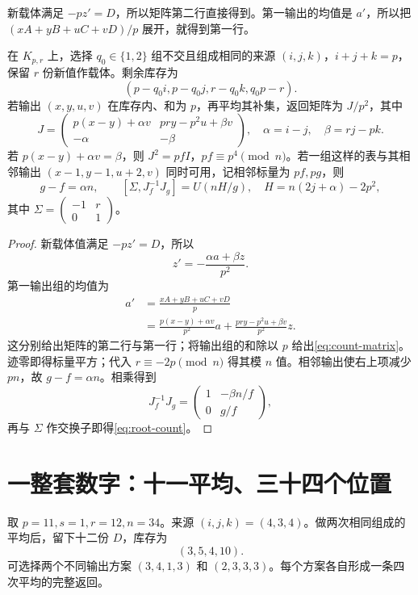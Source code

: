新载体满足 $-pz'=D$，所以矩阵第二行直接得到。第一输出的均值是 $a'$，所以把 $(xA+yB+uC+vD)/p$ 展开，就得到第一行。
\begin{lemma}[由库存表计算返回矩阵]\label{lem:count-interface}
在 $K_{p,r}$ 上，选择 $q_0\in\{1,2\}$ 组不交且组成相同的来源 $(i,j,k)$，$i+j+k=p$，保留 $r$ 份新值作载体。剩余库存为
\begin{equation}\label{eq:stock}
(p-q_0i,p-q_0j,r-q_0k,q_0p-r).
\end{equation}
若输出 $(x,y,u,v)$ 在库存内、和为 $p$，再平均其补集，返回矩阵为 $J/p^2$，其中
\begin{equation}\label{eq:count-matrix}
J=\begin{pmatrix}p(x-y)+\alpha v&pry-p^2u+\beta v\\-\alpha&-\beta\end{pmatrix},
\quad \alpha=i-j,\quad\beta=rj-pk.
\end{equation}
若 $p(x-y)+\alpha v=\beta$，则 $J^2=pfI$，$pf\equiv p^4\pmod n$。若一组这样的表与其相邻输出 $(x-1,y-1,u+2,v)$ 同时可用，记相邻标量为 $pf,pg$，则
\begin{equation}\label{eq:root-count}
g-f=\alpha n,\qquad
[\Sigma,J_f^{-1}J_g]=U(nH/g),\quad H=n(2j+\alpha)-2p^2,
\end{equation}
其中 $\Sigma=\left(\begin{smallmatrix}-1&r\\0&1\end{smallmatrix}\right)$。
\end{lemma}
\begin{proof}

新载体值满足 $-pz'=D$，所以
\[
z'=-\frac{\alpha a+\beta z}{p^2}.
\]
第一输出组的均值为
\begin{align*}
a'&=\frac{xA+yB+uC+vD}{p}\\
&=\frac{p(x-y)+\alpha v}{p^2}a
 +\frac{pry-p^2u+\beta v}{p^2}z.
\end{align*}
这分别给出矩阵的第二行与第一行；将输出组的和除以 $p$ 给出\eqref{eq:count-matrix}。迹零即得标量平方；代入 $r\equiv-2p\pmod n$ 得其模 $n$ 值。相邻输出使右上项减少 $pn$，故 $g-f=\alpha n$。相乘得到
\[
J_f^{-1}J_g=\begin{pmatrix}1&-\beta n/f\\0&g/f\end{pmatrix},
\]
再与 $\Sigma$ 作交换子即得\eqref{eq:root-count}。
\end{proof}

\section{一整套数字：十一平均、三十四个位置}
取 $p=11,s=1,r=12,n=34$。来源 $(i,j,k)=(4,3,4)$。做两次相同组成的平均后，留下十二份 $D$，库存为
\[(3,5,4,10).
\]
可选择两个不同输出方案 $(3,4,1,3)$ 和 $(2,3,3,3)$。每个方案各自形成一条四次平均的完整返回。

